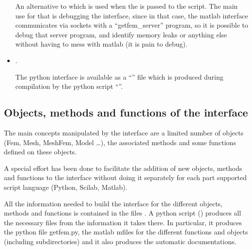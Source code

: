 \documentclass[a4paper,11pt,english]{sphinxmanual}
\begin{document}
\begin{itemize}
An alternative to  which is used when the
 is passed to the  script. The main use
for that is debugging the interface, since in that case, the matlab interface
communicates via sockets with a “getfem\_server” program, so it is possible to
debug that server program, and identify memory leaks or anything else without
having to mess with matlab (it is pain to debug).

\item {} 
.

The python interface is available as a “” file which is
produced during compilation by the python script
“”.

\end{itemize}


\subsection{Objects, methods and functions of the interface}
\label{\detokenize{project/libdesc_interface:objects-methods-and-functions-of-the-interface}}
The main concepts manipulated by the interface are a limited number of objects
(Fem, Mesh, MeshFem, Model …), the associated methods and some functions defined on these objects.

A special effort has been done to facilitate the addition of new objects, methods and functions to the interface without doing it separately for each part supported script language (Python, Scilab, Matlab).

All the information needed to build the interface for the different objects, methods and functions is contained in the files . A python script () produces all the necessary files from the information it takes there. In particular, it produces the python file getfem.py, the matlab m\sphinxhyphen{}files for the different functions and objects (including subdirectories) and it also produces the automatic documentations.
\end{document}
